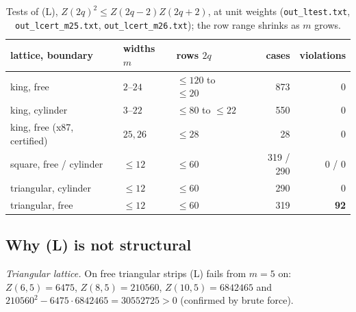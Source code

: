 \documentclass[11pt]{amsart}
\theoremstyle{definition}
\theoremstyle{remark}
\newcommand{\file}[1]{\texttt{#1}}
\begin{document}
\begin{table}[ht]
\caption{Tests of (L), $Z(2q)^2 \le Z(2q-2)Z(2q+2)$, at unit weights (\file{out\_ltest.txt},
\file{out\_lcert\_m25.txt}, \file{out\_lcert\_m26.txt}); the row range shrinks as $m$ grows.}\label{tab:L}
\begin{tabular}{lllrr}
\toprule
lattice, boundary & widths $m$ & rows $2q$ & cases & violations \\
\midrule
king, free     & $2$--$24$  & $\le 120$ to $\le 20$ & 873 & 0 \\
king, cylinder & $3$--$22$  & $\le 80$ to $\le 22$  & 550 & 0 \\
king, free (x87, certified) & $25, 26$ & $\le 28$ & 28 & 0 \\
square, free / cylinder     & $\le 12$ & $\le 60$ & 319 / 290 & 0 / 0 \\
triangular, cylinder        & $\le 12$ & $\le 60$ & 290 & 0 \\
triangular, free            & $\le 12$ & $\le 60$ & 319 & \textbf{92} \\
\bottomrule
\end{tabular}
\end{table}

\subsection{Why (L) is not structural}\label{sec:notstructural}
\emph{Triangular lattice.} On free triangular strips (L) fails from $m = 5$ on:
$Z(6, 5) = 6475$, $Z(8, 5) = 210560$, $Z(10, 5) = 6842465$ and
$210560^2 - 6475\cdot6842465 = 30552725 > 0$ (confirmed by brute force).
\end{document}
